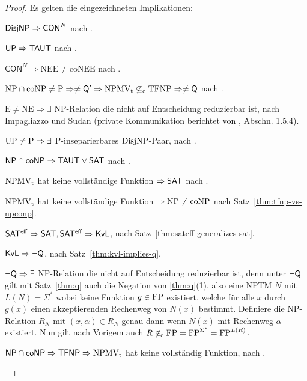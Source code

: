 \begin{proof}
    Es gelten die eingezeichneten Implikationen:
    \begin{Prooflist}[nosep]
\item $\mathsf{DisjNP} \Rightarrow \mathsf{CON}^N$ nach \textcite{kobler_optimal_2003}.
\item $\mathsf{UP} \Rightarrow \mathsf{TAUT}$ nach \textcite{kobler_optimal_2003}.
\item $\mathsf{CON}^N\Rightarrow \mathrm{NEE\neq coNEE}$ nach \textcite{kobler_optimal_2003}.
\item $\mathrm{NP}\cap\mathrm{coNP}\neq \mathrm{P} \Rightarrow \neq\mathsf{Q}' \Rightarrow \mathrm{NPMV_t} \not\subseteq_\mathrm{c} \mathrm{TFNP} \Rightarrow \neq\mathsf{Q}$ nach \textcite{fenner_inverting_2003}.
\item $\mathrm{E\neq NE}\Rightarrow \exists$ NP-Relation die nicht auf Entscheidung reduzierbar ist, nach Impagliazzo und Sudan (private Kommunikation berichtet von \cite{bellare_complexity_1994}, Abschn. 1.5.4).
\item $\mathrm{UP}\neq\mathrm{P} \Rightarrow \exists$ P-inseparierbares $\mathrm{DisjNP}$-Paar, nach \textcite[Thm.~5]{grollmann_complexity_1988}.
\item $\mathsf{NP}{}\cap{}\mathsf{coNP}\Rightarrow \mathsf{TAUT}\lor\mathsf{SAT}$ nach \textcite{beyersdorff_nondeterministic_2009}.
\item $\mathrm{NPMV_t}$ hat keine vollständige Funktion $\Rightarrow \mathsf{SAT}$ nach \textcite[Thm.~25]{beyersdorff_nondeterministic_2009}.
\item $\mathrm{NPMV_t}$ hat keine vollständige Funktion $\Rightarrow \mathrm{NP}\neq\mathrm{coNP}$ nach Satz~\ref{thm:tfnp-vs-npconp}.
\item $\mathsf{SAT^{eff}} \Rightarrow \mathsf{SAT}, \mathsf{SAT^{eff}}\Rightarrow \mathsf{KvL}$, nach Satz~\ref{thm:sateff-generalizes-sat}.
\item $\mathsf{KvL}\Rightarrow\neg\mathsf{Q}$, nach Satz~\ref{thm:kvl-implies-q}.
\item $\neg\mathsf{Q}\Rightarrow \exists$ NP-Relation die nicht auf Entscheidung reduzierbar ist, denn unter $\neg\mathsf{Q}$ gilt mit Satz~\ref{thm:q} auch die Negation von \ref{thm:q}(1), also eine NPTM $N$ mit $L(N)=\Sigma^*$ wobei keine Funktion $g\in\mathrm{FP}$ existiert, welche für alle $x$ durch $g(x)$ einen akzeptierenden Rechenweg von $N(x)$ bestimmt.
    Definiere die NP-Relation $R_N$ mit $(x,\alpha)\in R_N$ genau dann wenn $N(x)$ mit Rechenweg $\alpha$ existiert. Nun gilt nach Vorigem auch $R\not\in_\mathrm{c} \mathrm{FP}=\mathrm{FP}^{\Sigma^*} = \mathrm{FP}^{L(R)}$.
\item $\mathsf{NP}{}\cap{}\mathsf{coNP} \Rightarrow \mathsf{TFNP} \Rightarrow \mathrm{NPMV_t}$ hat keine vollständig Funktion, nach \textcite{pudlak_incompleteness_2017}.

\end{Prooflist}
\end{proof}
